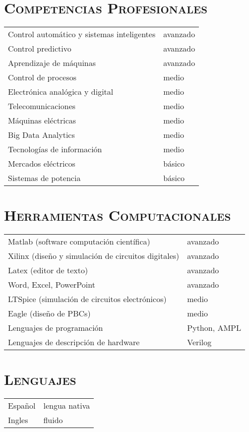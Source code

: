 \documentclass[a4paper,10pt]{article}
\begin{document}
\bigskip
\section*{\textsc{Competencias Profesionales}}

\begin{tabular}{ll}
Control automático y sistemas inteligentes		& avanzado\\
Control predictivo & avanzado\\
Aprendizaje de máquinas		& avanzado\\
Control de procesos & medio\\
Electrónica analógica y digital & medio\\
Telecomunicaciones		& medio\\
Máquinas eléctricas		& medio\\
Big Data Analytics & medio\\
Tecnologías de información & medio\\
Mercados eléctricos		& básico\\
Sistemas de potencia & básico\\
\end{tabular}

\bigskip
\section*{\textsc{Herramientas Computacionales}}

\begin{tabular}{ll}
Matlab (software computación científica) 					& avanzado\\
Xilinx (diseño y simulación de circuitos digitales)		& avanzado\\
Latex (editor de texto)									& avanzado\\
Word, Excel, PowerPoint									& avanzado\\
LTSpice (simulación de circuitos electrónicos)			& medio\\
Eagle (diseño de PBCs)									& medio\\
Lenguajes de programación								& Python, AMPL\\
Lenguajes de descripción de hardware					& Verilog
\end{tabular}

\bigskip
\section*{\textsc{Lenguajes}}

\begin{tabular}{ll}
Español & lengua nativa\\
Ingles & fluido
\end{tabular}
\end{document}
